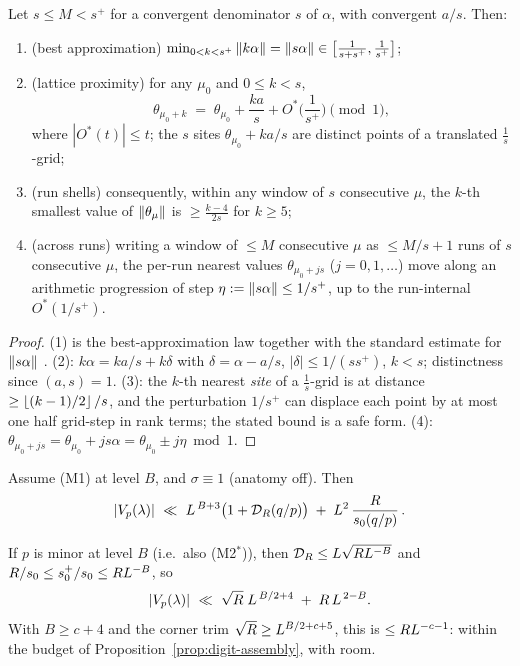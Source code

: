 \begin{lemma}\label{lem:cf}
\statusP\quad
Let $s\le M<s^{+}$ for a convergent denominator $s$ of $\alpha$, with
convergent $a/s$. Then:
\begin{enumerate}
\item (best approximation)
$\min_{0<k<s^{+}}\left\| k\alpha\right\|=\left\| s\alpha\right\|\in
\big[\tfrac{1}{s+s^{+}},\tfrac1{s^{+}}\big]$;
\item (lattice proximity) for any $\mu_0$ and $0\le k<s$,
\[
\theta_{\mu_0+k}\;=\;\theta_{\mu_0}+\frac{ka}{s}+O^*\Big(\frac1{s^{+}}\Big)
\pmod 1,
\]
where $|O^*(t)|\le t$; the $s$ sites $\theta_{\mu_0}+ka/s$ are distinct
points of a translated $\frac1s$-grid;
\item (run shells) consequently, within any window of $s$ consecutive
$\mu$, the $k$-th smallest value of $\left\| \theta_\mu\right\|$ is
$\ge\frac{k-4}{2s}$ for $k\ge5$;
\item (across runs) writing a window of $\le M$ consecutive $\mu$ as
$\le M/s+1$ runs of $s$ consecutive $\mu$, the per-run nearest values
$\theta_{\mu_0+js}$ ($j=0,1,\ldots$) move along an arithmetic progression
of step $\eta:=\left\| s\alpha\right\|\le1/s^{+}$, up to the run-internal
$O^*(1/s^{+})$.
\end{enumerate}
\end{lemma}

\begin{proof}
(1) is the best-approximation law together with the standard estimate
for $\left\| s\alpha\right\|$ \cite[Ch.~I--II]{Khin}. (2): $k\alpha=ka/s+k\delta$
with $\delta=\alpha-a/s$, $|\delta|\le1/(ss^{+})$, $k<s$; distinctness
since $(a,s)=1$. (3): the $k$-th nearest \emph{site} of a
$\frac1s$-grid is at distance $\ge\left\lfloor (k-1)/2\right\rfloor/s$, and the perturbation
$1/s^{+}$ can displace each point by at most one half grid-step in rank
terms; the stated bound is a safe form. (4): $\theta_{\mu_0+js}
=\theta_{\mu_0}+js\alpha=\theta_{\mu_0}\pm j\eta\bmod 1$.
\end{proof}

\begin{theorem}\label{thm:minor}
\statusP\quad
Assume (M1) at level $B$, and $\sigma\equiv1$ (anatomy off). Then
\[
|V_p(\lambda)|\ \ll\ \Llog^{\,B+3}\big(1+\mathcal D_R(q/p)\big)
\;+\;\Llog^{2}\,\frac{R}{s_0(q/p)}\,.
\]
\end{theorem}

\begin{corollary}\label{cor:minor}
\statusP\quad
If $p$ is minor at level $B$ (i.e.\ also (M2$^*$)), then
$\mathcal D_R\le L\sqrt{RL^{-B}}$ and
$R/s_0\le s_0^{+}/s_0\le RL^{-B}$, so
\[
|V_p(\lambda)|\ \ll\ \sqrt R\;L^{\,B/2+4}\;+\;R\,L^{\,2-B}.
\]
With $B\ge c+4$ and the corner trim $\sqrt R\ge L^{B/2+c+5}$, this is
$\le RL^{-c-1}$: within the budget of
Proposition~\ref{prop:digit-assembly}, with room.
\end{corollary}

